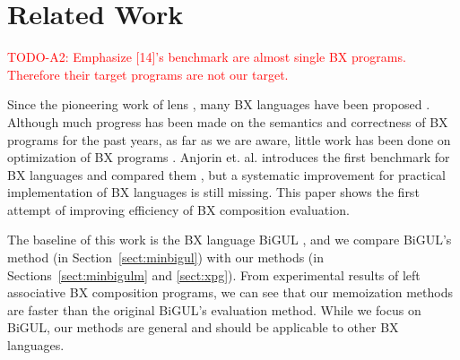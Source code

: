 \section{Related Work} \label{sect:related}


\textcolor{red}{TODO-A2: Emphasize [14]'s benchmark are almost single BX programs. Therefore their target programs are not our target.}

Since the pioneering work of lens \cite{Foster:2007:CBT:1232420.1232424}, many BX languages have been proposed \cite{Bohannon06relationallenses:, Bohannon:2008:BRL:1328438.1328487,Buchmann:2018:BFI:3362232.3362263,Ko:2016:BFV:2847538.2847544,LeblebiciAS14,Samimi-Dehkordi18,Cicchetti2011,Hinkel:2019:CPB:3318595.3318634}.
Although much progress has been made on the semantics and correctness of BX programs for the past years, as far as we are aware, little work has been done on optimization of BX programs \cite{Horn:2018:IRL:3243631.3236769}. Anjorin et. al. introduces the first benchmark for BX languages and compared them \cite{Anjorin2019}, but a systematic improvement for practical implementation of BX languages is still missing. This paper shows the first attempt of improving efficiency of BX composition evaluation.

The baseline of this work is the BX language BiGUL \cite{Ko:2016:BFV:2847538.2847544, Ko:2017:ABB:3177123.3158129}, and we compare BiGUL's method (in Section~\ref{sect:minbigul}) with our methods (in Sections~\ref{sect:minbigulm} and \ref{sect:xpg}). From experimental results of left associative BX composition programs, we can see that our memoization methods are faster than the original BiGUL's evaluation method.
While we focus on BiGUL, our methods are general and should be applicable to other BX languages.


